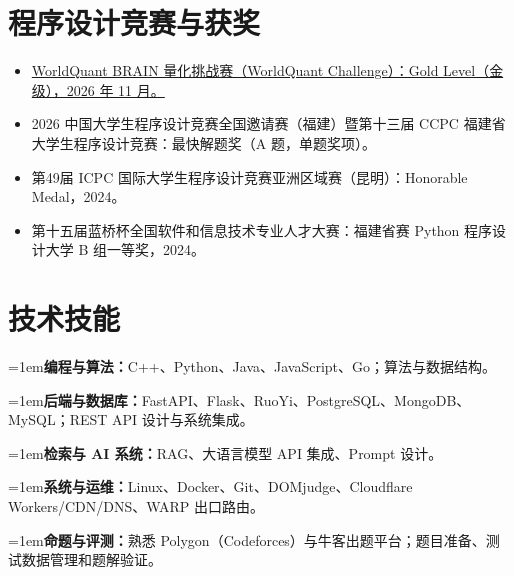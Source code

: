 \documentclass[10pt,a4paper]{article}
\newcommand{\skillrow}[2]{%
  \par\noindent\hangindent=1em\hangafter=1\textbf{#1：}#2\par
}
\begin{document}
\section{程序设计竞赛与获奖}
\begin{itemize}
  \item \href{https://au1bhi.com/files/WorldQuant-Challenge-Gold-Certificate.pdf}{WorldQuant BRAIN 量化挑战赛（WorldQuant Challenge）：Gold Level（金级），2026 年 11 月。}
  \item 2026 中国大学生程序设计竞赛全国邀请赛（福建）暨第十三届 CCPC 福建省大学生程序设计竞赛：最快解题奖（A 题，单题奖项）。
  \item 第49届 ICPC 国际大学生程序设计竞赛亚洲区域赛（昆明）：Honorable Medal，2024。
  \item 第十五届蓝桥杯全国软件和信息技术专业人才大赛：福建省赛 Python 程序设计大学 B 组一等奖，2024。
\end{itemize}
\section{技术技能}
\skillrow{编程与算法}{C++、Python、Java、JavaScript、Go；算法与数据结构。}
\skillrow{后端与数据库}{FastAPI、Flask、RuoYi、PostgreSQL、MongoDB、MySQL；REST API 设计与系统集成。}
\skillrow{检索与 AI 系统}{RAG、大语言模型 API 集成、Prompt 设计。}
\skillrow{系统与运维}{Linux、Docker、Git、DOMjudge、Cloudflare Workers/CDN/DNS、WARP 出口路由。}
\skillrow{命题与评测}{熟悉 Polygon（Codeforces）与牛客出题平台；题目准备、测试数据管理和题解验证。}
\end{document}
